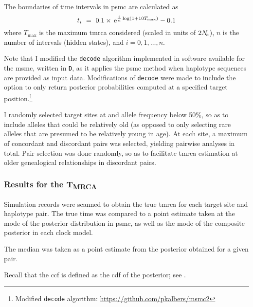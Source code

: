 The boundaries of time intervals in \gls{psmc} are calculated as
\begin{equation*}
	t_i ~=~ 0.1 \times \,\mathrm{e}^{\frac{i}{n}\log(1 + 10  T_{\max})} - 0.1
\end{equation*}
where $T_{\max}$ is the maximum \gls{tmrca} considered (scaled in units of $2N_{\!e}$), $n$ is the number of intervals (\ie hidden states), and ${i=0,1,\ldots,n}$.

Note that I modified the \texttt{decode} algorithm implemented in software available for the \gls{msmc}, written in \texttt{D}, as it applies the \gls{psmc} method when  haplotype sequences are provided as input data.
Modifications of \texttt{decode} were made to include the option to only return posterior probabilities computed at a specified target position.\footnote{Modified \texttt{decode} algorithm: \url{https://github.com/pkalbers/msmc2} }




I randomly selected  target sites at  and allele frequency below 50\%, so as to include alleles that could be relatively old (as opposed to only selecting rare alleles that are presumed to be relatively young in age).
At each site, a maximum of  concordant and  discordant pairs was selected, yielding  pairwise analyses in total.
Pair selection was done randomly, so as to facilitate \gls{tmrca} estimation at older genealogical relationships in discordant pairs.


%
\subsubsection{Results for the T\textsubscript{MRCA}}
%

Simulation records were scanned to obtain the true \gls{tmrca} for each target site and haplotype pair.
The true time was compared to a point estimate taken at the mode of the posterior distribution in \gls{psmc},
as well as the mode of the composite posterior in each clock model.


The median was taken as a point estimate from the posterior obtained for a given pair.





%

%



%

%


Recall that the \gls{ccf} is defined as the \gls{cdf} of the posterior; see .
%




